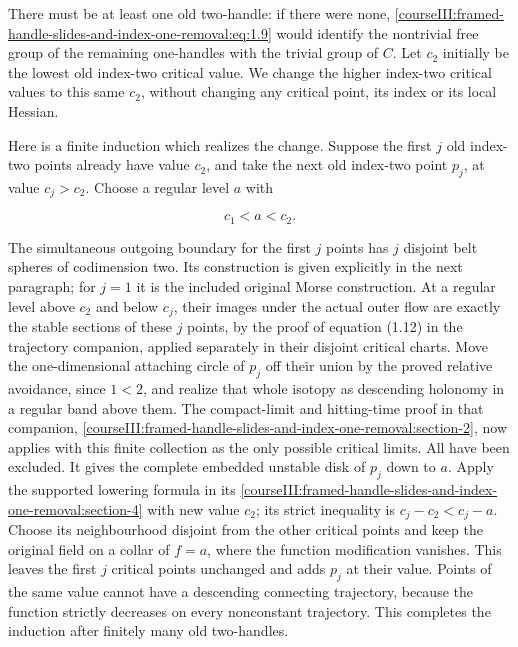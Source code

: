 There must be at least one old two-handle: if there were none, \eqref{courseIII:framed-handle-slides-and-index-one-removal:eq:1.9} would identify the nontrivial free group of the remaining one-handles with the trivial group of \(C\). Let \(c_2\) initially be the lowest old index-two critical value. We change the higher index-two critical values to this same \(c_2\), without changing any critical point, its index or its local Hessian.

Here is a finite induction which realizes the change. Suppose the first \(j\) old index-two points already have value \(c_2\), and take the next old index-two point \(p_j\), at value \(c_j>c_2\). Choose a regular level \(a\) with

\begin{equation}
c_1<a<c_2.
 \label{courseIII:framed-handle-slides-and-index-one-removal:eq:6.1}
\end{equation}

The simultaneous outgoing boundary for the first \(j\) points has \(j\) disjoint belt spheres of codimension two. Its construction is given explicitly in the next paragraph; for \(j=1\) it is the included original Morse construction. At a regular level above \(c_2\) and below \(c_j\), their images under the actual outer flow are exactly the stable sections of these \(j\) points, by the proof of equation (1.12) in the trajectory companion, applied separately in their disjoint critical charts. Move the one-dimensional attaching circle of \(p_j\) off their union by the proved relative avoidance, since \(1<2\), and realize that whole isotopy as descending holonomy in a regular band above them. The compact-limit and hitting-time proof in that companion, \cref{courseIII:framed-handle-slides-and-index-one-removal:section-2}, now applies with this finite collection as the only possible critical limits. All have been excluded. It gives the complete embedded unstable disk of \(p_j\) down to \(a\). Apply the supported lowering formula in its \cref{courseIII:framed-handle-slides-and-index-one-removal:section-4} with new value \(c_2\); its strict inequality is
\(c_j-c_2<c_j-a\). Choose its neighbourhood disjoint from the other critical points and keep the original field on a collar of \(f=a\), where the function modification vanishes. This leaves the first \(j\) critical points unchanged and adds \(p_j\) at their value. Points of the same value cannot have a descending connecting trajectory, because the function strictly decreases on every nonconstant trajectory. This completes the induction after finitely many old two-handles.

